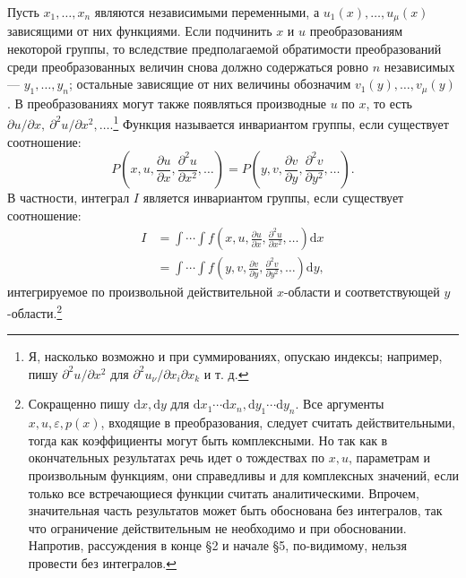 \documentclass[11pt]{article}
\providecommand{\eps}{\varepsilon}
\providecommand{\p}{\partial}
\providecommand{\dd}{\mathrm d}
\begin{document}
Пусть \(x_1,\ldots,x_n\) являются независимыми переменными, а \(u_1(x),\ldots,u_\mu(x)\) зависящими от них функциями. Если подчинить \(x\) и \(u\) преобразованиям некоторой группы, то вследствие предполагаемой обратимости преобразований среди преобразованных величин снова должно содержаться ровно \(n\) независимых --- \(y_1,\ldots,y_n\); остальные зависящие от них величины обозначим \(v_1(y),\ldots,v_\mu(y)\). В преобразованиях могут также появляться производные \(u\) по \(x\), то есть \(\p u/\p x,\ \p^2u/\p x^2,\ldots\).\footnote{Я, насколько возможно и при суммированиях, опускаю индексы; например, пишу \(\p^2u/\p x^2\) для \(\p^2u_\nu/\p x_i\p x_k\) и т. д.} Функция называется инвариантом группы, если существует соотношение:
\[
P\!\left(x,u,\frac{\p u}{\p x},\frac{\p^2u}{\p x^2},\ldots\right)
 =
P\!\left(y,v,\frac{\p v}{\p y},\frac{\p^2v}{\p y^2},\ldots\right).
\]
В частности, интеграл \(I\) является инвариантом группы, если существует соотношение:
\begin{equation}
\begin{aligned}
I&=\int\!\cdots\!\int f\!\left(x,u,\frac{\p u}{\p x},\frac{\p^2u}{\p x^2},\ldots\right)\dd x\\
 &=\int\!\cdots\!\int f\!\left(y,v,\frac{\p v}{\p y},\frac{\p^2v}{\p y^2},\ldots\right)\dd y,
\end{aligned}
\tag{1}
\end{equation}
интегрируемое по произвольной действительной \(x\)-области и соответствующей \(y\)-области.\footnote{Сокращенно пишу \(\dd x,\dd y\) для \(\dd x_1\cdots \dd x_n,\dd y_1\cdots \dd y_n\). Все аргументы \(x,u,\eps,p(x)\), входящие в преобразования, следует считать действительными, тогда как коэффициенты могут быть комплексными. Но так как в окончательных результатах речь идет о тождествах по \(x,u\), параметрам и произвольным функциям, они справедливы и для комплексных значений, если только все встречающиеся функции считать аналитическими. Впрочем, значительная часть результатов может быть обоснована без интегралов, так что ограничение действительным не необходимо и при обосновании. Напротив, рассуждения в конце \S{}2 и начале \S{}5, по-видимому, нельзя провести без интегралов.}
\end{document}
